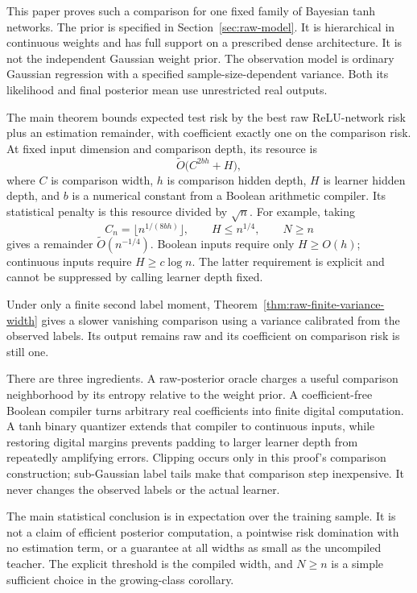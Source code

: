 \documentclass[11pt]{article}
\begin{document}
This paper proves such a comparison for one fixed family of Bayesian tanh
networks.  The prior is specified in Section~\ref{sec:raw-model}.  It is
hierarchical in continuous weights and has full support on a prescribed
dense architecture.  It is not the independent Gaussian weight prior.
The observation model is ordinary Gaussian regression with a specified
sample-size-dependent variance.  Both its likelihood and final posterior
mean use unrestricted real outputs.

The main theorem bounds expected test risk by the best raw ReLU-network
risk plus an estimation remainder, with coefficient exactly one on the
comparison risk.  At fixed input dimension and comparison depth, its
resource is
\[
 \widetilde O\big(C^{2bh}+H\big),
\]
where $C$ is comparison width, $h$ is comparison hidden depth, $H$ is
learner hidden depth, and $b$ is a numerical constant from a Boolean
arithmetic compiler.  Its statistical penalty is this resource divided
by $\sqrt n$.  For example, taking
\[
 C_n=\lfloor n^{1/(8bh)}\rfloor,\qquad H\le n^{1/4},\qquad N\ge n
\]
gives a remainder $\widetilde O(n^{-1/4})$.  Boolean inputs require only
$H\ge O(h)$; continuous inputs require $H\ge c\log n$.  The latter
requirement is explicit and cannot be suppressed by calling learner
depth fixed.

Under only a finite second label moment, Theorem~\ref{thm:raw-finite-variance-width}
gives a slower vanishing comparison using a variance calibrated from the
observed labels.  Its output remains raw and its coefficient on comparison
risk is still one.

There are three ingredients.  A raw-posterior oracle charges a useful
comparison neighborhood by its entropy relative to the weight prior.
A coefficient-free Boolean compiler turns arbitrary real coefficients
into finite digital computation.  A tanh binary quantizer extends that
compiler to continuous inputs, while restoring digital margins prevents
padding to larger learner depth from repeatedly amplifying errors.
Clipping occurs only in this proof's comparison construction; sub-Gaussian
label tails make that comparison step inexpensive.  It never changes
the observed labels or the actual learner.

The main statistical conclusion is in expectation over the training
sample.  It is not a claim of efficient posterior computation, a
pointwise risk domination with no estimation term, or a guarantee at
all widths as small as the uncompiled teacher.  The explicit threshold
is the compiled width, and $N\ge n$ is a simple sufficient choice in
the growing-class corollary.
\end{document}
